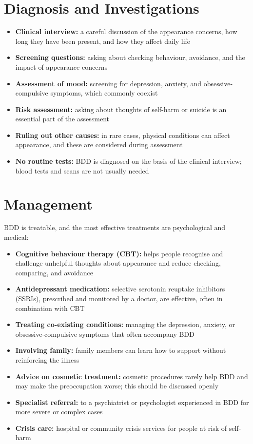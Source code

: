 \section*{Diagnosis and Investigations}
\begin{itemize}
    \item \textbf{Clinical interview:} a careful discussion of the appearance concerns, how long they have been present, and how they affect daily life
    \item \textbf{Screening questions:} asking about checking behaviour, avoidance, and the impact of appearance concerns
    \item \textbf{Assessment of mood:} screening for depression, anxiety, and obsessive-compulsive symptoms, which commonly coexist
    \item \textbf{Risk assessment:} asking about thoughts of self-harm or suicide is an essential part of the assessment
    \item \textbf{Ruling out other causes:} in rare cases, physical conditions can affect appearance, and these are considered during assessment
    \item \textbf{No routine tests:} BDD is diagnosed on the basis of the clinical interview; blood tests and scans are not usually needed
\end{itemize}

\section*{Management}
BDD is treatable, and the most effective treatments are psychological and medical:

\begin{itemize}
    \item \textbf{Cognitive behaviour therapy (CBT):} helps people recognise and challenge unhelpful thoughts about appearance and reduce checking, comparing, and avoidance
    \item \textbf{Antidepressant medication:} selective serotonin reuptake inhibitors (SSRIs), prescribed and monitored by a doctor, are effective, often in combination with CBT
    \item \textbf{Treating co-existing conditions:} managing the depression, anxiety, or obsessive-compulsive symptoms that often accompany BDD
    \item \textbf{Involving family:} family members can learn how to support without reinforcing the illness
    \item \textbf{Advice on cosmetic treatment:} cosmetic procedures rarely help BDD and may make the preoccupation worse; this should be discussed openly
    \item \textbf{Specialist referral:} to a psychiatrist or psychologist experienced in BDD for more severe or complex cases
    \item \textbf{Crisis care:} hospital or community crisis services for people at risk of self-harm
\end{itemize}

